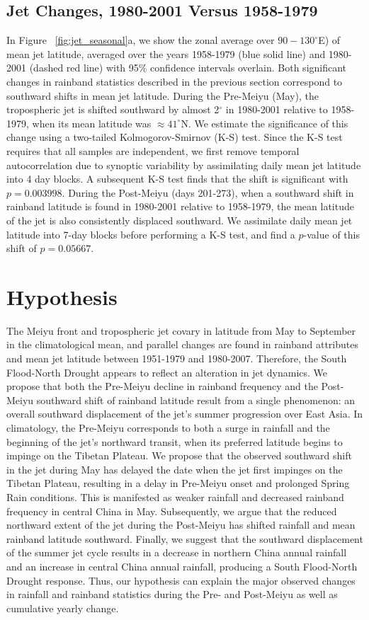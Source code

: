\subsection{Jet Changes, 1980-2001 Versus 1958-1979}

	In Figure ~\ref{fig:jet_seasonal}a, we show the zonal average over $90-130^\circ$E) of mean jet latitude, averaged over the years 1958-1979 (blue solid line) and 1980-2001 (dashed red line) with 95\% confidence intervals overlain. Both significant changes in rainband statistics described in the previous section correspond to southward shifts in mean jet latitude. During the Pre-Meiyu (May), the tropospheric jet is shifted southward by almost 2$^{\circ}$ in 1980-2001 relative to 1958-1979, when its mean latitude was $\approx 41^{\circ}$N. We estimate the significance of this change using a two-tailed Kolmogorov-Smirnov (K-S) test. Since the K-S test requires that all samples are independent, we first remove temporal autocorrelation due to synoptic variability by assimilating daily mean jet latitude into 4 day blocks. A subsequent K-S test finds that the shift is significant with $p=0.003998$. During the Post-Meiyu (days 201-273), when a southward shift in rainband latitude is found in 1980-2001 relative to 1958-1979, the mean latitude of the jet is also consistently displaced southward. We assimilate daily mean jet latitude into 7-day blocks before performing a K-S test, and find a $p$-value of this shift of $p=0.05667$.
	
\section{Hypothesis}

	The Meiyu front and tropospheric jet covary in latitude from May to September in the climatological mean, and parallel changes are found in rainband attributes and mean jet latitude between 1951-1979 and 1980-2007. Therefore, the South Flood-North Drought appears to reflect an alteration in jet dynamics. We propose that both the Pre-Meiyu decline in rainband frequency and the Post-Meiyu southward shift of rainband latitude result from a single phenomenon: an overall southward displacement of the jet's summer progression over East Asia. In climatology, the Pre-Meiyu corresponds to both a surge in rainfall and the beginning of the jet's northward transit, when its preferred latitude begins to impinge on the Tibetan Plateau. We propose that the observed southward shift in the jet during May has delayed the date when the jet first impinges on the Tibetan Plateau, resulting in a delay in Pre-Meiyu onset and prolonged Spring Rain conditions. This is manifested as weaker rainfall and decreased rainband frequency in central China in May. Subsequently, we argue that the reduced northward extent of the jet during the Post-Meiyu has shifted rainfall and mean rainband latitude southward. Finally, we suggest that the southward displacement of the summer jet cycle results in a decrease in northern China annual rainfall and an increase in central China annual rainfall, producing a South Flood-North Drought response. Thus, our hypothesis can explain the major observed changes in rainfall and rainband statistics during the Pre- and Post-Meiyu as well as cumulative yearly change.
	
